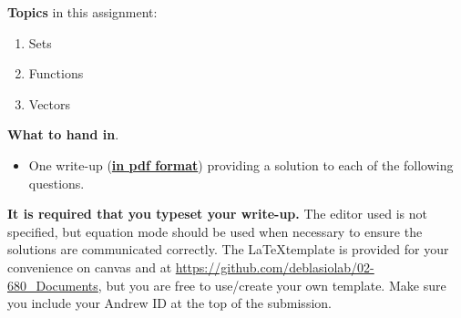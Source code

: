 \noindent 
{\bf Topics} in this assignment: 
\begin{enumerate}
\item Sets
\item Functions
\item Vectors
\end{enumerate}
\vspace{0.2in}


\noindent 
{\bf What to hand in}. 
\begin{itemize}
\item One write-up (\underline{\textbf{in pdf format}}) providing a solution to each of the following questions.
\end{itemize}

\textbf{It is required that you typeset your write-up.} 
The editor used is not specified, but equation mode should be used when necessary to ensure the solutions are communicated correctly.
The \LaTeX template is provided for your convenience on canvas and at \url{https://github.com/deblasiolab/02-680_Documents}, but you are free to use/create your own template. 
Make sure you include your Andrew ID at the top of the submission.\\

